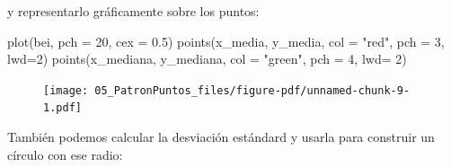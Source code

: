 \documentclass[
  letterpaper,
  DIV=11,
  numbers=noendperiod]{scrreprt}
\newenvironment{Shaded}{\begin{snugshade}}{\end{snugshade}}
\newcommand{\AttributeTok}[1]{\textcolor[rgb]{0.40,0.45,0.13}{#1}}
\newcommand{\DecValTok}[1]{\textcolor[rgb]{0.68,0.00,0.00}{#1}}
\newcommand{\FloatTok}[1]{\textcolor[rgb]{0.68,0.00,0.00}{#1}}
\newcommand{\FunctionTok}[1]{\textcolor[rgb]{0.28,0.35,0.67}{#1}}
\newcommand{\NormalTok}[1]{\textcolor[rgb]{0.00,0.23,0.31}{#1}}
\newcommand{\OtherTok}[1]{\textcolor[rgb]{0.00,0.23,0.31}{#1}}
\newcommand{\SpecialCharTok}[1]{\textcolor[rgb]{0.37,0.37,0.37}{#1}}
\newcommand{\StringTok}[1]{\textcolor[rgb]{0.13,0.47,0.30}{#1}}
\begin{document}
\begin{Shaded}
\end{Shaded}

y representarlo gráficamente sobre los puntos:

\begin{Shaded}
\begin{Highlighting}[]
\FunctionTok{plot}\NormalTok{(bei, }\AttributeTok{pch =} \DecValTok{20}\NormalTok{, }\AttributeTok{cex =} \FloatTok{0.5}\NormalTok{)}
\FunctionTok{points}\NormalTok{(x\_media, y\_media, }\AttributeTok{col =} \StringTok{"red"}\NormalTok{, }\AttributeTok{pch =} \DecValTok{3}\NormalTok{, }\AttributeTok{lwd=}\DecValTok{2}\NormalTok{)}
\FunctionTok{points}\NormalTok{(x\_mediana, y\_mediana, }\AttributeTok{col =} \StringTok{"green"}\NormalTok{, }\AttributeTok{pch =} \DecValTok{4}\NormalTok{, }\AttributeTok{lwd=} \DecValTok{2}\NormalTok{)}
\end{Highlighting}
\end{Shaded}

\begin{figure}[H]

{\centering \texttt{[image: 05\_PatronPuntos\_files/figure-pdf/unnamed-chunk-9-1.pdf]}

}

\end{figure}

También podemos calcular la desviación estándard y usarla para construir
un círculo con ese radio:

\begin{Shaded}
\end{Shaded}
\end{document}
